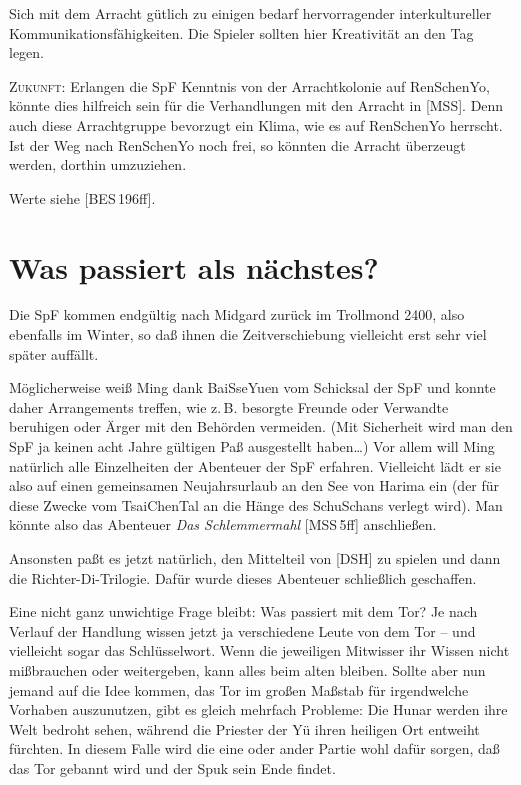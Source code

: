 \documentclass[
a4paper,
twoside,
DIV=calc,
BCOR=4mm,
fontsize=9pt,
twocolumn=on,
titlepage=on,
parskip=half
]{scrartcl}
\begin{document}
Sich mit dem Arracht gütlich zu einigen bedarf hervorragender
interkultureller Kommunikationsfähigkeiten. Die Spieler sollten hier
Kreativität an den Tag legen.

\textsc{Zukunft:} Erlangen die SpF Kenntnis von der Arrachtkolonie auf
RenSchenYo, könnte dies hilfreich sein für die Verhandlungen mit den
Arracht in [MSS]. Denn auch diese Arrachtgruppe bevorzugt ein Klima,
wie es auf RenSchenYo herrscht. Ist der Weg nach RenSchenYo noch frei,
so könnten die Arracht überzeugt werden, dorthin umzuziehen.

Werte siehe [BES\,196ff].

\appendix

\section{Was passiert als nächstes?}

Die SpF kommen endgültig nach Midgard zurück im Trollmond 2400, also
ebenfalls im Winter, so daß ihnen die Zeitverschiebung vielleicht erst
sehr viel später auffällt.

Möglicherweise weiß Ming dank BaiSseYuen vom Schicksal der SpF und
konnte daher Arrangements treffen, wie z.\,B. besorgte Freunde oder
Verwandte beruhigen oder Ärger mit den Behörden vermeiden. (Mit
Sicherheit wird man den SpF ja keinen acht Jahre gültigen Paß
ausgestellt haben\dots) Vor allem will Ming natürlich alle
Einzelheiten der Abenteuer der SpF erfahren. Vielleicht lädt er sie
also auf einen gemeinsamen Neujahrsurlaub an den See von Harima ein
(der für diese Zwecke vom TsaiChenTal an die Hänge des SchuSchans
verlegt wird). Man könnte also das Abenteuer \emph{Das Schlemmermahl}
[MSS\,5ff] anschließen.

Ansonsten paßt es jetzt natürlich, den Mittelteil von [DSH] zu spielen
und dann die Richter-Di-Trilogie. Dafür wurde dieses Abenteuer
schließlich geschaffen.

Eine nicht ganz unwichtige Frage bleibt: Was passiert mit dem Tor? Je
nach Verlauf der Handlung wissen jetzt ja verschiedene Leute von dem
Tor -- und vielleicht sogar das Schlüsselwort. Wenn die jeweiligen
Mitwisser ihr Wissen nicht mißbrauchen oder weitergeben, kann alles
beim alten bleiben. Sollte aber nun jemand auf die Idee kommen, das
Tor im großen Maßstab für irgendwelche Vorhaben auszunutzen, gibt es
gleich mehrfach Probleme: Die Hunar werden ihre Welt bedroht sehen,
während die Priester der Yü ihren heiligen Ort entweiht fürchten. In
diesem Falle wird die eine oder ander Partie wohl dafür sorgen, daß
das Tor gebannt wird und der Spuk sein Ende findet.
\end{document}
